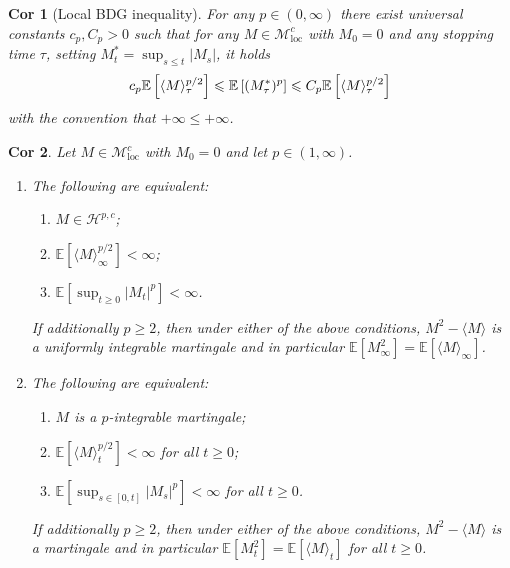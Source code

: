 \documentclass[a4paper]{article}
\theoremstyle{mytheoremstyle}
\newtheorem{corollary}{Cor}[theorem]
\newcommand{\1}{\mathds{1}}
\begin{document}
\begin{multicols*}{3}
\begin{unlabeledbox}
\begin{corollary}[Local BDG inequality]
  \label{cor:localBDG}For any $p \in (0, \infty)$ there exist universal
  constants $c_p, C_p > 0$ such that for any $M \in
  \mathcal{M}^c_{\operatorname{loc}}$ with $M_0 = 0$ and any stopping time $\tau$,
  setting $M^{*}_t = \sup_{s \leqslant t}  | M_s |$, it holds
  \vspace{-0.5em}
  \[
    c_p \mathbb{E} \left[\langle M \rangle_{\tau}^{p / 2} \right] \leqslant
    \mathbb{E} \left[ (M^{*}_{\tau})^p \right] \leqslant
    C_p \mathbb{E} \left[ \langle M \rangle_{\tau}^{p / 2} \right]
  \vspace{-0.5em}
  \]
  with the convention that $+ \infty \leqslant + \infty$.
\end{corollary}

\begin{corollary}
  \label{cor:lp-martingale}Let $M \in \mathcal{M}_{\operatorname{loc}}^c$ with $M_0 =
  0$ and let $p \in (1, \infty)$.
  \begin{enumerate}[parsep=0.25em]
    \item The following are equivalent:
    \begin{enumerate}
      \item $M \in \mathcal{H}^{p, c}$;
      
      \item $\mathbb{E} \left[ \langle M \rangle_{\infty}^{p / 2} \right] < \infty$;
      
      \item $\mathbb{E} \left[ \sup_{t \geqslant 0}  | M_t |^p \right] < \infty$.
    \end{enumerate}
    If additionally $p \geqslant 2$, then under either of the above
    conditions, $M^2 - \langle M \rangle$ is a uniformly integrable martingale
    and in particular $\mathbb{E} [M_{\infty}^2] =\mathbb{E} [\langle M
    \rangle_{\infty}]$.
    
    \item The following are equivalent:
    \begin{enumerate}[parsep=0.25em]
      \item $M$ is a $p$-integrable martingale;
      
      \item $\mathbb{E} \left[ \langle M \rangle_t^{p / 2} \right] < \infty$ for all $t
      \geqslant 0$;
      
      \item $\mathbb{E} \left[ \sup_{s \in [0, t]}  | M_s |^p \right] < \infty$ for all $t
      \geqslant 0$.
    \end{enumerate}
    If additionally $p \geqslant 2$, then under either of the above
    conditions, $M^2 - \langle M \rangle$ is a martingale and in particular
    $\mathbb{E} [M_t^2] =\mathbb{E} [\langle M \rangle_t]$ for all $t
    \geqslant 0$.
  \end{enumerate}
\end{corollary}


\end{unlabeledbox}
\end{multicols*}
\end{document}
